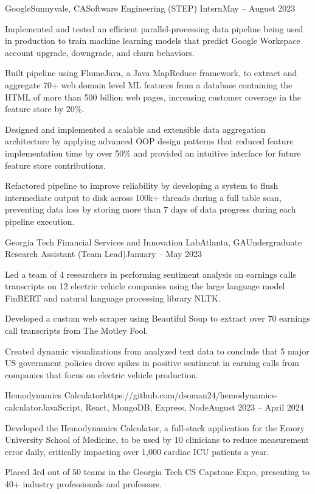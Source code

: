 \documentclass{article}
\begin{document}
\begin{flushleft}
    \begin{experience}{Google}{Sunnyvale, CA}{Software Engineering (STEP) Intern}{May -- August 2023}
        \item Implemented and tested an efficient parallel-processing data pipeline being used in production to train machine learning models that predict Google Workspace account upgrade, downgrade, and churn behaviors.
        \item Built pipeline using FlumeJava, a Java MapReduce framework, to extract and aggregate 70+ web domain level ML features from a database containing the HTML of more than 500 billion web pages, increasing customer coverage in the feature store by 20\%.
        \item Designed and implemented a scalable and extensible data aggregation architecture by applying advanced OOP design patterns that reduced feature implementation time by over 50\% and provided an intuitive interface for future feature store contributions.
        \item Refactored pipeline to improve reliability by developing a system to flush intermediate output to disk across 100k+ threads during a full table scan, preventing data loss by storing more than 7 days of data progress during each pipeline execution.
    \end{experience}

    \begin{experience}{Georgia Tech Financial Services and Innovation Lab}{Atlanta, GA}{Undergraduate Research Assistant (Team Lead)}{January -- May 2023}
        \item Led a team of 4 researchers in performing sentiment analysis on earnings calls transcripts on 12 electric vehicle companies using the large language model FinBERT and natural language processing library NLTK.
        \item Developed a custom web scraper using Beautiful Soup to extract over 70 earnings call transcripts from The Motley Fool.
        \item Created dynamic visualizations from analyzed text data to conclude that 5 major US government policies drove spikes in positive sentiment in earning calls from companies that focus on electric vehicle production.
    \end{experience}



    \vspace{3pt}

    \begin{project}{Hemodynamics Calculator}{https://github.com/dsoman24/hemodynamics-calculator}{JavaScript, React, MongoDB, Express, Node}{August 2023 -- April 2024}
        \item Developed the Hemodynamics Calculator, a full-stack application for the Emory University School of Medicine, to be used by 10 clinicians to reduce measurement error daily, critically impacting over 1,000 cardiac ICU patients a year.
        \item Placed 3rd out of 50 teams in the Georgia Tech CS Capstone Expo, presenting to 40+ industry professionals and professors.
    \end{project}


\end{flushleft}
\end{document}
